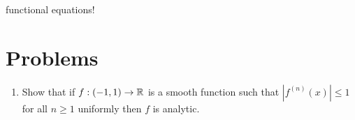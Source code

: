 \documentclass{../../large}
\begin{document}
functional equations!


\section{}
\section{}





\section*{Problems}

	
\begin{enumerate}
\item Show that if $f:(-1,1)\to\mathbb{R}$ is a smooth function such that $|f^{(n)}(x)|\le1$ for all $n\ge1$ uniformly then $f$ is analytic.
\end{enumerate}
\end{document}

